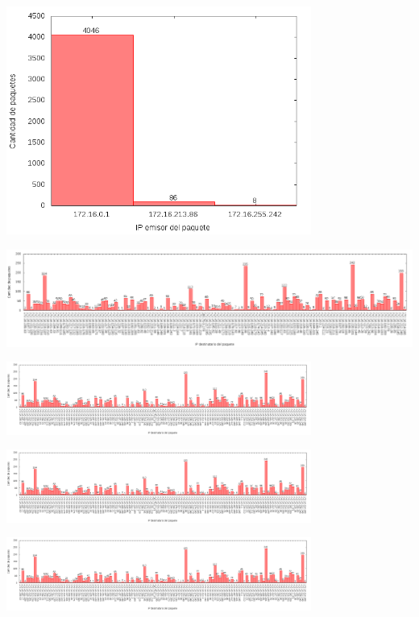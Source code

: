\includegraphics[width=10cm]{../mediciones/altop-wifi-60/altop60IpsSrcArp.png}

\includegraphics[width=14cm]{../mediciones/altop-wifi-60/altop60IpsDstArp.png}

\includegraphics[width=10cm,trim={0 0 35.95cm 0},clip]{../mediciones/altop-wifi-60/altop60IpsDstArp.png}

\includegraphics[width=10cm,trim={17cm 0 20.7cm 0},clip]{../mediciones/altop-wifi-60/altop60IpsDstArp.png}

\includegraphics[width=10cm,trim={32.26cm 0 0 0},clip]{../mediciones/altop-wifi-60/altop60IpsDstArp.png}
